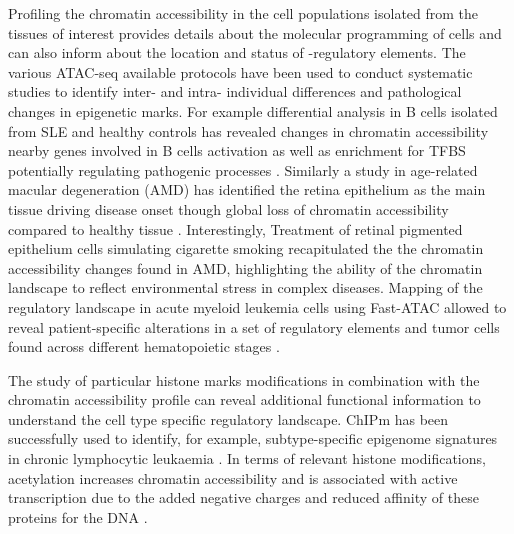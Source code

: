 Profiling the chromatin accessibility in the cell populations isolated from the tissues of interest provides details about the molecular programming of cells and can also inform about the location and status of -regulatory elements. The various ATAC-seq available protocols have been used to conduct systematic studies to identify inter- and intra- individual differences and pathological changes in epigenetic marks. For example differential analysis in B cells isolated from SLE and healthy controls has revealed changes in chromatin accessibility nearby genes involved in B cells activation as well as enrichment for TFBS potentially regulating pathogenic processes \parencite{Scharer2016}. Similarly a study in age-related macular degeneration (AMD) has identified the retina epithelium as the main tissue driving disease onset though global loss of chromatin accessibility compared to healthy tissue \parencite{Wang2018}. Interestingly, Treatment of retinal pigmented epithelium cells simulating cigarette smoking recapitulated the the chromatin accessibility changes found in AMD, highlighting the ability of the chromatin landscape to reflect environmental stress in complex diseases. Mapping of the regulatory landscape in acute myeloid leukemia cells using Fast-ATAC allowed to reveal patient-specific alterations in a set of regulatory elements and tumor cells found across different hematopoietic stages \parencite{Corces2016}. 

The study of particular histone marks modifications in combination with the chromatin accessibility profile can reveal additional functional information to understand the cell type specific regulatory landscape. ChIPm has been successfully used to identify, for example, subtype-specific epigenome signatures in chronic lymphocytic leukaemia \parencite{Rendeiro2015}. In terms of relevant histone modifications, acetylation increases chromatin accessibility and is associated with active transcription due to the added negative charges and reduced affinity of these proteins for the DNA \parencite{Creyghton2010}. 

